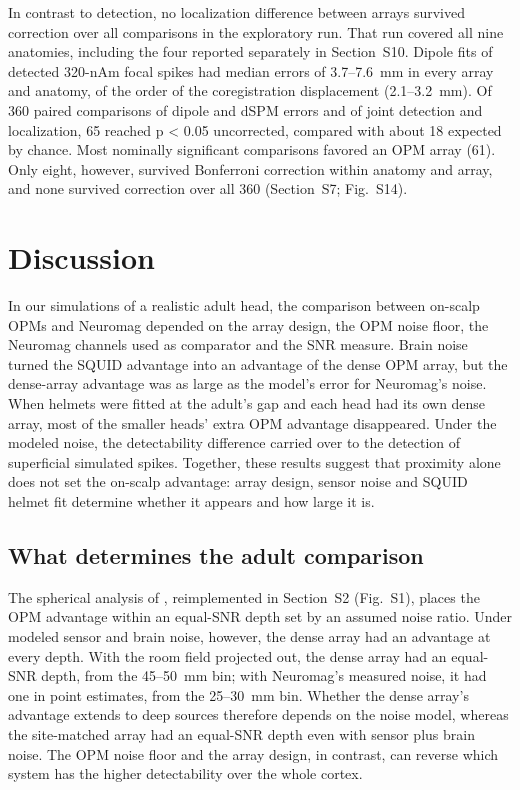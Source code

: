 \documentclass[preprint,12pt,authoryear,a4paper]{elsarticle}
\begin{document}
In contrast to detection, no localization difference between arrays survived correction over all comparisons in the exploratory run. That run covered all nine anatomies, including the four reported separately in Section~S10. Dipole fits of detected 320-nAm focal spikes had median errors of 3.7–7.6~mm in every array and anatomy, of the order of the coregistration displacement (2.1–3.2~mm). Of 360 paired comparisons of dipole and dSPM errors and of joint detection and localization, 65 reached p < 0.05 uncorrected, compared with about 18 expected by chance. Most nominally significant comparisons favored an OPM array (61). Only eight, however, survived Bonferroni correction within anatomy and array, and none survived correction over all 360 (Section~S7; Fig.~S14).

\FloatBarrier


\section{Discussion}\label{sec:discussion}

In our simulations of a realistic adult head, the comparison between on-scalp OPMs and Neuromag depended on the array design, the OPM noise floor, the Neuromag channels used as comparator and the SNR measure. Brain noise turned the SQUID advantage into an advantage of the dense OPM array, but the dense-array advantage was as large as the model's error for Neuromag's noise. When helmets were fitted at the adult's gap and each head had its own dense array, most of the smaller heads' extra OPM advantage disappeared. Under the modeled noise, the detectability difference carried over to the detection of superficial simulated spikes. Together, these results suggest that proximity alone does not set the on-scalp advantage: array design, sensor noise and SQUID helmet fit determine whether it appears and how large it is.

\subsection{What determines the adult comparison}\label{sec:disc-noise}

The spherical analysis of \citet{jas2026}, reimplemented in Section~S2 (Fig.~S1), places the OPM advantage within an equal-SNR depth set by an assumed noise ratio. Under modeled sensor and brain noise, however, the dense array had an advantage at every depth. With the room field projected out, the dense array had an equal-SNR depth, from the 45–50~mm bin; with Neuromag's measured noise, it had one in point estimates, from the 25–30~mm bin. Whether the dense array's advantage extends to deep sources therefore depends on the noise model, whereas the site-matched array had an equal-SNR depth even with sensor plus brain noise. The OPM noise floor and the array design, in contrast, can reverse which system has the higher detectability over the whole cortex.
\end{document}
